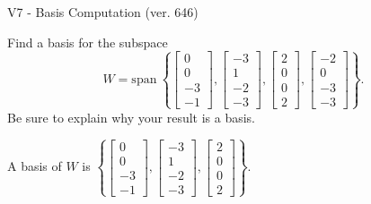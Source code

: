 \begin{exercise}
  \begin{exerciseTitle}V7 - Basis Computation (ver. 646)\end{exerciseTitle}
  \begin{exerciseStatement}
    Find a basis for the subspace 
\[W=\mathrm{span}\ \left\{\left[\begin{array}{r}
0 \\
0 \\
-3 \\
-1
\end{array}\right] , \left[\begin{array}{r}
-3 \\
1 \\
-2 \\
-3
\end{array}\right] , \left[\begin{array}{r}
2 \\
0 \\
0 \\
2
\end{array}\right] , \left[\begin{array}{r}
-2 \\
0 \\
-3 \\
-3
\end{array}\right]\right\}.\]
 Be sure to explain why your result is a basis.


  \end{exerciseStatement}
  \begin{exerciseAnswer}
   A basis of \(W\) is  \(\left\{\left[\begin{array}{r}
0 \\
0 \\
-3 \\
-1
\end{array}\right] , \left[\begin{array}{r}
-3 \\
1 \\
-2 \\
-3
\end{array}\right] , \left[\begin{array}{r}
2 \\
0 \\
0 \\
2
\end{array}\right]\right\}\).
  


  \end{exerciseAnswer}
\end{exercise}